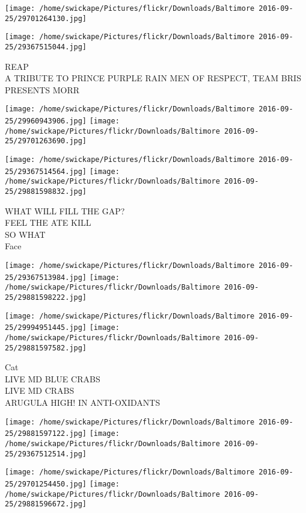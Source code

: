 \documentclass[10pt,letterpaper]{article}
\begin{document}
\texttt{[image: /home/swickape/Pictures/flickr/Downloads/Baltimore 2016-09-25/29701264130.jpg]}

\vspace{0.25in}
\texttt{[image: /home/swickape/Pictures/flickr/Downloads/Baltimore 2016-09-25/29367515044.jpg]}

REAP\\
A TRIBUTE TO PRINCE PURPLE RAIN MEN OF RESPECT, TEAM BRIS PRESENTS MORR\\
\pagebreak

\texttt{[image: /home/swickape/Pictures/flickr/Downloads/Baltimore 2016-09-25/29960943906.jpg]}
\texttt{[image: /home/swickape/Pictures/flickr/Downloads/Baltimore 2016-09-25/29701263690.jpg]}

\texttt{[image: /home/swickape/Pictures/flickr/Downloads/Baltimore 2016-09-25/29367514564.jpg]}
\texttt{[image: /home/swickape/Pictures/flickr/Downloads/Baltimore 2016-09-25/29881598832.jpg]}

WHAT WILL FILL THE GAP?\\
FEEL THE ATE KILL\\
SO WHAT\\
Face\\
\pagebreak

\texttt{[image: /home/swickape/Pictures/flickr/Downloads/Baltimore 2016-09-25/29367513984.jpg]}
\texttt{[image: /home/swickape/Pictures/flickr/Downloads/Baltimore 2016-09-25/29881598222.jpg]}

\texttt{[image: /home/swickape/Pictures/flickr/Downloads/Baltimore 2016-09-25/29994951445.jpg]}
\texttt{[image: /home/swickape/Pictures/flickr/Downloads/Baltimore 2016-09-25/29881597582.jpg]}

Cat\\
LIVE MD BLUE CRABS\\
LIVE MD CRABS\\
ARUGULA HIGH! IN ANTI{-}OXIDANTS\\
\pagebreak

\texttt{[image: /home/swickape/Pictures/flickr/Downloads/Baltimore 2016-09-25/29881597122.jpg]}
\texttt{[image: /home/swickape/Pictures/flickr/Downloads/Baltimore 2016-09-25/29367512514.jpg]}

\texttt{[image: /home/swickape/Pictures/flickr/Downloads/Baltimore 2016-09-25/29701254450.jpg]}
\texttt{[image: /home/swickape/Pictures/flickr/Downloads/Baltimore 2016-09-25/29881596672.jpg]}
\end{document}
